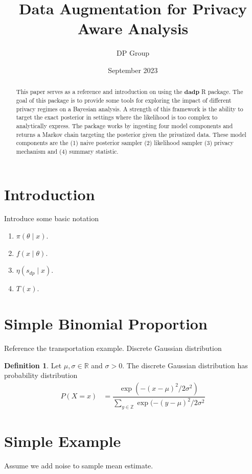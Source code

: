 \documentclass{article}\usepackage[]{graphicx}\usepackage[]{xcolor}
\title{Data Augmentation for Privacy Aware Analysis}
\author{DP Group}
\date{September 2023}
\theoremstyle{definition}
\newtheorem{definition}{Definition}[section]
\newcommand{\dpn}{\textbf{dadp}}
\begin{document}
\maketitle

\begin{abstract}
    This paper serves as a reference and introduction on using the $\dpn$ R
    package. The goal of this package is to provide some tools for exploring the
    impact of different privacy regimes on a Bayesian analysis. A strength of
    this framework is the ability to target the exact posterior in settings
    where the likelihood is too complex to analytically express.
    The package works by ingesting four model components and returns
    a Markov chain targeting the posterior given the privatized data. These
    model components are the (1) naive posterior sampler (2) likelihood sampler
    (3) privacy mechanism and (4) summary statistic.
\end{abstract}

\section*{Introduction}
Introduce some basic notation

\begin{enumerate}
  \item $\pi(\theta \mid x)$.
  \item $f(x \mid \theta)$.
  \item $\eta(s_{dp} \mid x)$.
  \item $T(x)$.
\end{enumerate}

\section*{Simple Binomial Proportion}
Reference the transportation example. Discrete Gaussian distribution

\begin{definition}
Let $\mu, \sigma \in \mathbb{R}$  and $\sigma > 0$. The discrete Gaussian
distribution has probability distribution
\begin{align*}
P(X = x) &= \dfrac{\exp(-(x-\mu)^2/2\sigma^2)}{\sum_{y \in \mathbb{Z}} \exp(-(y-\mu)^2/2\sigma^2}
\end{align*}
\end{definition}

\section*{Simple Example}
Assume we add noise to sample mean estimate.
\end{document}
